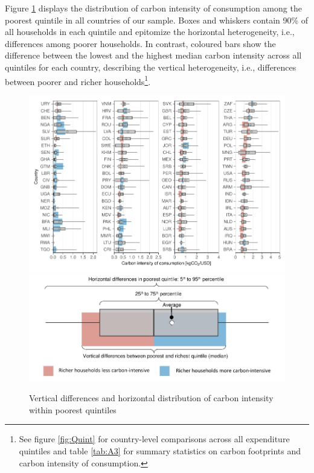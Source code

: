 \documentclass[12pt, a4paper]{article}
\newenvironment{subcaption2}
{\strut
\vspace{-5pt}
\begin{minipage}[b]{0.95\textwidth}
  \hspace*{-\parindent}
  \footnotesize}
 {\end{minipage}}
\begin{document}
Figure \ref{fig:fig_1} displays the distribution of carbon intensity of consumption among the poorest quintile in all countries of our sample. Boxes and whiskers contain 90\% of all households in each quintile and epitomize the horizontal heterogeneity, i.e., differences among poorer households. In contrast, coloured bars show the difference between the lowest and the highest median carbon intensity across all quintiles for each country, describing the vertical heterogeneity, i.e., differences between poorer and richer households\footnote{See figure \ref{fig:Quint} for country-level comparisons across all expenditure quintiles and table \ref{tab:A3} for summary statistics on carbon footprints and carbon intensity of consumption.}.

\begin{figure}[ht!]
    \centering
    \includegraphics{1_Figures/Figure 1/Figure_1_2017_11B.pdf}
    \includegraphics[scale=0.7]{1_Figures/Figure 1/Legend Figure 1.pdf}
    \caption{Vertical differences and horizontal distribution of carbon intensity within poorest quintiles}
    \label{fig:fig_1}
    \begin{subcaption2}

\end{subcaption2}
\end{figure}
\end{document}
